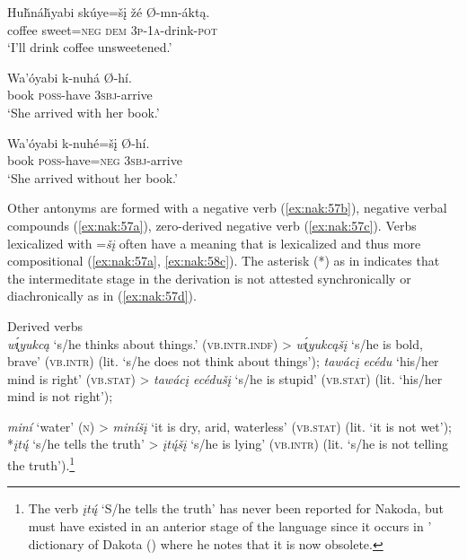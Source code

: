 \documentclass[output=paper,colorlinks,citecolor=brown]{langscibook}
\begin{document}
\ea\label{ex:nak:55}
    \gll Huȟnáȟyabi skúye=šį žé Ø-mn-áktą. \\
         coffee sweet=\textsc{neg} \textsc{dem} \textsc{3p-1a}-drink-\textsc{pot} \\
    \glt ‘I’ll drink coffee unsweetened.’
\z 

\ea\label{ex:nak:56}
    \ea\label{ex:nak:56a}
        \gll Wa’óyabi k-nuhá Ø-hí. \\ 
             book \textsc{poss}-have \textsc{3sbj}-arrive \\
        \glt ‘She arrived with her book.’
    
    \ex\label{ex:nak:56b}
        \gll Wa’óyabi k-nuhé=šį Ø-hí. \\
             book \textsc{poss}-have=\textsc{neg} \textsc{3sbj}-arrive \\
        \glt ‘She arrived without her book.’
    \z
\z 

Other antonyms are formed with a negative verb (\ref{ex:nak:57b}), negative verbal compounds (\ref{ex:nak:57a}), zero-derived negative verb (\ref{ex:nak:57c}). Verbs lexicalized with =\textit{šį} often have a meaning that is lexicalized and thus more compositional (\ref{ex:nak:57a}, \ref{ex:nak:58c}). The asterisk (*) as in  indicates that the intermeditate stage in the derivation is not attested synchronically or diachronically as in (\ref{ex:nak:57d}).

\ea\label{ex:nak:57} {Derived verbs}\\
    \ea\label{ex:nak:57b} \textit{w\'{\k{ı}}yukcą} ‘s/he thinks about things.’ (\textsc{vb.intr.indf}) \newline > \textit{w\'{\k{ı}}yukcąšį} ‘s/he is bold, brave’ (\textsc{vb.intr}) (lit. ‘s/he does not think about things’);
    \ex\label{ex:nak:57a} \textit{tawácį ecédu} ‘his/her mind is right’ (\textsc{vb.stat}) \newline > \textit{tawácį ecédušį} ‘s/he is stupid’ (\textsc{vb.stat}) (lit. ‘his/her mind is not right’);

    \ex\label{ex:nak:57c} \textit{miní} ‘water’ (\textsc{n}) \newline > \textit{miníšį} ‘it is dry, arid, waterless’ (\textsc{vb.stat}) (lit. ‘it is not wet’);
    \ex\label{ex:nak:57d} *\textit{įt\'{ų}} ‘s/he tells the truth’ \newline > \textit{įt\'{ų}šį} ‘s/he is lying’ (\textsc{vb.intr}) (lit. ‘s/he is not telling the truth’).\footnote{The verb \textit{įt\'{ų}} ‘S/he tells the truth’ has never been reported for Nakoda, but must have existed in an anterior stage of the language since it occurs in \citeauthor{Riggs1992}' dictionary of Dakota  (\citeyear{Riggs1992}) where he notes that it is now obsolete.}
    \z
\z 
\end{document}
